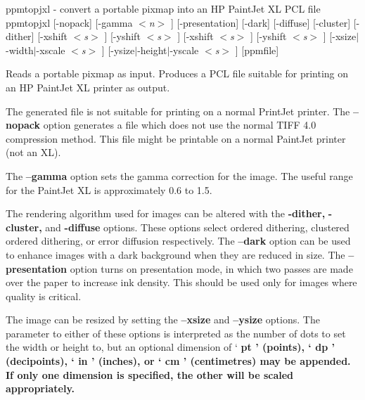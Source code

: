 %

\newpage
%

ppmtopjxl - convert a portable pixmap into an HP PaintJet XL PCL file
ppmtopjxl [-nopack] [-gamma
{\it $<$n$>$}
] [-presentation] [-dark] [-diffuse] [-cluster] [-dither] [-xshift
{\it $<$s$>$}
] [-yshift
{\it $<$s$>$}
] [-xshift
{\it $<$s$>$}
] [-yshift
{\it $<$s$>$}
] [-xsize$|$-width$|$-xscale
{\it $<$s$>$}
] [-ysize$|$-height$|$-yscale
{\it $<$s$>$}
] [ppmfile]

Reads a portable pixmap as input.
Produces a PCL file suitable for printing on an HP PaintJet XL printer as
output.
\par
The generated file is not suitable for printing on a normal PrintJet printer.
The
{\bf --nopack}
option generates a file which does not use the normal TIFF 4.0 compression
method. This file might be printable on a normal PaintJet printer (not an XL).
\par
The
{\bf --gamma}
option sets the gamma correction for the image. The useful range for the
PaintJet XL is approximately 0.6 to 1.5.
\par
The rendering algorithm used for images can be altered with the
{\bf -dither,}
{\bf -cluster,}
and
{\bf -diffuse}
options. These options select ordered dithering, clustered ordered dithering,
or error diffusion respectively.
The
{\bf --dark}
option can be used to enhance images with a dark background when they are
reduced in size.
The
{\bf --presentation}
option turns on presentation mode, in which two passes are made over the paper
to increase ink density. This should be used only for images where quality is
critical.

\par
The image can be resized by setting the 
{\bf --xsize}
and 
{\bf --ysize}
options. The parameter to either of these options is interpreted as the
number of dots to set the width or height to, but an optional dimension of
`%
\bf pt%
\rm ' (points), `%
\bf dp%
\rm ' (decipoints), `%
\bf in%
\rm ' (inches), or
`%
\bf cm%
\rm ' (centimetres) may be appended.
If only one dimension is specified, the other will be scaled appropriately.

